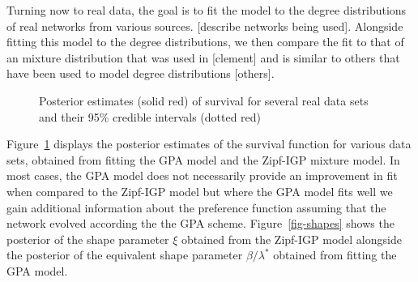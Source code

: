\documentclass[
  sn-basic,
]{sn-jnl}
\theoremstyle{plain}
\theoremstyle{remark}
\begin{document}
Turning now to real data, the goal is to fit the model to the degree
distributions of real networks from various sources. {[}describe
networks being used{]}. Alongside fitting this model to the degree
distributions, we then compare the fit to that of an mixture
distribution that was used in {[}clement{]} and is similar to others
that have been used to model degree distributions {[}others{]}.

\begin{figure}[H]


\caption{\label{fig-real1}Posterior estimates (solid red) of survival
for several real data sets and their 95\% credible intervals (dotted
red)}

\end{figure}%

Figure~\ref{fig-real1} displays the posterior estimates of the survival
function for various data sets, obtained from fitting the GPA model and
the Zipf-IGP mixture model. In most cases, the GPA model does not
necessarily provide an improvement in fit when compared to the Zipf-IGP
model but where the GPA model fits well we gain additional information
about the preference function assuming that the network evolved
according the the GPA scheme. Figure~\ref{fig-shapes} shows the
posterior of the shape parameter \(\xi\) obtained from the Zipf-IGP
model alongside the posterior of the equivalent shape parameter
\(\beta/\lambda^*\) obtained from fitting the GPA model.
\end{document}
